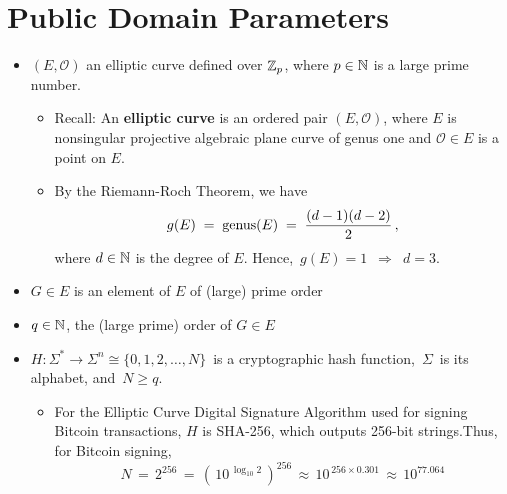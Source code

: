 
\section{Public Domain Parameters}
\setcounter{theorem}{0}
\setcounter{equation}{0}


\begin{itemize}
\item
	$(E,\mathcal{O})$ an elliptic curve defined over $\mathbb{Z}_{p}$, where $p \in \mathbb{N}$ is a large prime number.
	\begin{itemize}
	\item
		Recall: An \textbf{elliptic curve} is an ordered pair $(E,\mathcal{O})$,
		where $E$ is nonsingular projective algebraic plane curve of genus one and
		$\mathcal{O} \in E$ is a point on $E$.
	\item
		By the Riemann-Roch Theorem, we have
		\begin{equation*}
		g(E) \; = \; \textnormal{genus}(E) \; = \; \dfrac{(d-1)(d-2)}{2}\,,
		\end{equation*}
		where $d \in \mathbb{N}$ is the degree of $E$.
		Hence, \,$g(E) = 1$\, $\Longrightarrow$ \,$d = 3$.\,
	\end{itemize}
\item
	$G \in E$ is an element of $E$ of (large) prime order
\item
	$q \in \mathbb{N}$, the (large prime) order of $G \in E$
\item
	$H : \Sigma^{*} \longrightarrow \Sigma^{n} \cong \{0,1,2,\ldots,N\}$\,
	is a cryptographic hash function,
	\,$\Sigma$\, is its alphabet, and \,$N \geq q$.
	\begin{itemize}
	\item
		For the Elliptic Curve Digital Signature Algorithm used for signing Bitcoin transactions,
		$H$ is SHA-256, which outputs 256-bit strings.Thus, for Bitcoin signing,
		\begin{equation*}
		N \, = \, 2^{256} \, = \, \left(\,10^{\,\log_{10}2}\,\right)^{256}
		\, \approx \, 10^{\,256 \times 0.301} \, \approx \, 10^{77.064}
		\end{equation*}
	\end{itemize}
\end{itemize}

